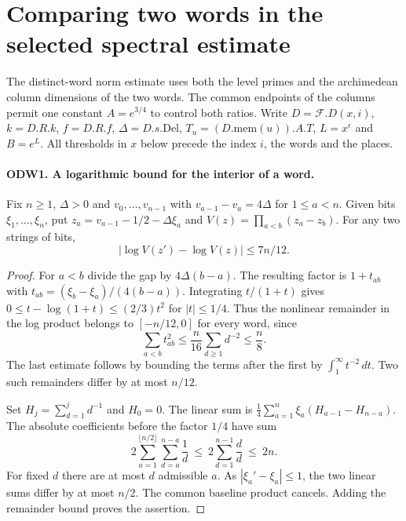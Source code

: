 \section{Comparing two words in the selected spectral estimate}
\label{sec:offdiag-v62}

The distinct-word norm estimate uses both the level primes and the
archimedean column dimensions of the two words. The common endpoints
of the columns permit one constant $A=e^{3/4}$ to control both
ratios. Write $D=\mathcal F.D(x,i)$, $k=D.R.k$, $f=D.R.f$,
$\Delta=D.s.\mathrm{Del}$, $T_u=(D.\mathrm{mem}(u)).A.T$,
$L=x^\epsilon$ and $B=e^L$. All thresholds in $x$ below precede
the index $i$, the words and the places.

\paragraph{ODW1. A logarithmic bound for the interior of a word.}
\label{claim:ODW1}
Fix $n\ge1$, $\Delta>0$ and $v_0,\ldots,v_{n-1}$ with
$v_{a-1}-v_a=4\Delta$ for $1\le a<n$. Given bits
$\xi_1,\ldots,\xi_n$, put $z_a=v_{a-1}-1/2-\Delta\xi_a$ and
$V(z)=\prod_{a<b}(z_a-z_b)$. For any two strings of bits,
\[
                    |\log V(z')-\log V(z)|\le 7n/12 .
\]
\begin{proof}
For $a<b$ divide the gap by $4\Delta(b-a)$. The resulting factor
is $1+t_{ab}$ with $t_{ab}=(\xi_b-\xi_a)/(4(b-a))$.
Integrating $t/(1+t)$ gives
$0\le t-\log(1+t)\le (2/3)t^2$ for $|t|\le1/4$.
Thus the nonlinear remainder in the log product belongs to
$[-n/12,0]$ for every word, since
\[
 \sum_{a<b}t_{ab}^2\le \frac{n}{16}\sum_{d\ge1}d^{-2}
 \le\frac{n}{8}.
\]
The last estimate follows by bounding the terms after the first by
$\int_1^\infty t^{-2}\,dt$. Two such remainders differ by at most
$n/12$.

Set $H_j=\sum_{d=1}^j d^{-1}$ and $H_0=0$. The linear sum is
$\tfrac14\sum_{a=1}^n\xi_a(H_{a-1}-H_{n-a})$.
The absolute coefficients before the factor $1/4$ have sum
\[
 2\sum_{a=1}^{\lfloor n/2\rfloor}\sum_{d=a}^{n-a}\frac1d
 \ \le\ 2\sum_{d=1}^{n-1}\frac{d}{d}\ \le\ 2n .
\]
For fixed $d$ there are at most $d$ admissible $a$.
As $|\xi_a'-\xi_a|\le1$, the two linear sums differ by at most
$n/2$. The common baseline product cancels. Adding the remainder
bound proves the assertion.
\end{proof}

